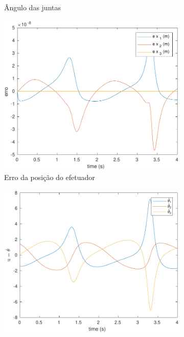 \documentclass[a4paper,11pt]{article}
\theoremstyle{mytheor}
\begin{document}
\begin{figure}[!ht]
\begin{minipage}{\linewidth}
\begin{subfigure}[b]{0.49\textwidth}
    \caption{Ângulo das juntas}
    \label{fig:ex2_1_q}
    \end{subfigure}
    \begin{subfigure}[b]{0.49\textwidth}
    \includegraphics[width=1\textwidth]{figs/ex2_1_e.pdf}
    \caption{Erro da posição do efetuador}
    \label{fig:ex2_1_e}
    \end{subfigure}
  \end{minipage}
  \begin{minipage}{\linewidth}
  \centering
    \begin{subfigure}[b]{0.49\textwidth}
    \includegraphics[width=1\textwidth]{figs/ex2_1_dq.pdf}

\end{subfigure}
\end{minipage}
\end{figure}
\end{document}
